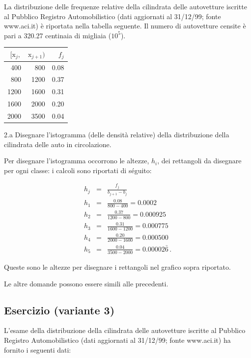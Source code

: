 \documentclass[
  11pt,
]{book}
\theoremstyle{mytheoremstyle}
\theoremstyle{mydefstyle}
\newenvironment{sol}
  {
  \begin{tcolorbox}[enhanced,breakable,arc=0.1mm,boxrule=1pt,colback=white,colframe=iblue,
  title=\bf \fontfamily{lmss}\selectfont \hspace{.5 cm} Soluzione,drop fuzzy shadow]

}{
\end{tcolorbox}
  }
\begin{document}
La distribuzione delle frequenze relative della cilindrata
delle autovetture iscritte al Pubblico Registro Automobilistico
(dati aggiornati al 31/12/99; fonte www.aci.it) è riportata
nella tabella seguente.
Il numero di autovetture censite è pari a 320.27 centinaia
di migliaia (\(10^{5}\)).

\begin{tabular}{rrr}
\toprule
$[\text{x}_j,$ & $\text{x}_{j+1})$ & $f_j$\\
\midrule
400 & 800 & 0.08\\
800 & 1200 & 0.37\\
1200 & 1600 & 0.31\\
1600 & 2000 & 0.20\\
2000 & 3500 & 0.04\\
\bottomrule
\end{tabular}

2.a Disegnare l'istogramma (delle densità relative) della
distribuzione della cilindrata delle auto in circolazione.

\begin{sol}
Per disegnare l'istogramma occorrono le altezze, \(h_{i}\),
dei rettangoli da disegnare per ogni classe: i calcoli sono
riportati di séguito:

\begin{eqnarray*}
h_{j} &=& \frac{f_{j}} {b_{j+1} - b_{j}}                \\
h_{1} &=& \frac{0.08} { 800 -  400} =  0.0002   \\
h_{2} &=& \frac{0.37} {1200 -  800} =  0.000925 \\
h_{3} &=& \frac{0.31} {1600 - 1200} =  0.000775 \\
h_{4} &=& \frac{0.20} {2000 - 1600} =  0.000500 \\
h_{5} &=& \frac{0.04} {3500 - 2000} =  0.00002\bar{6} \, .
\end{eqnarray*}

Queste sono le altezze per disegnare i rettangoli nel grafico
sopra riportato.

Le altre domande possono essere simili alle precedenti.

\end{sol}

\subsection{Esercizio (variante 3)}\label{esercizio-variante-3}

L'esame della distribuzione della cilindrata delle autovetture
iscritte al Pubblico Registro Automobilistico (dati aggiornati
al 31/12/99; fonte www.aci.it) ha fornito i seguenti dati:
\end{document}
